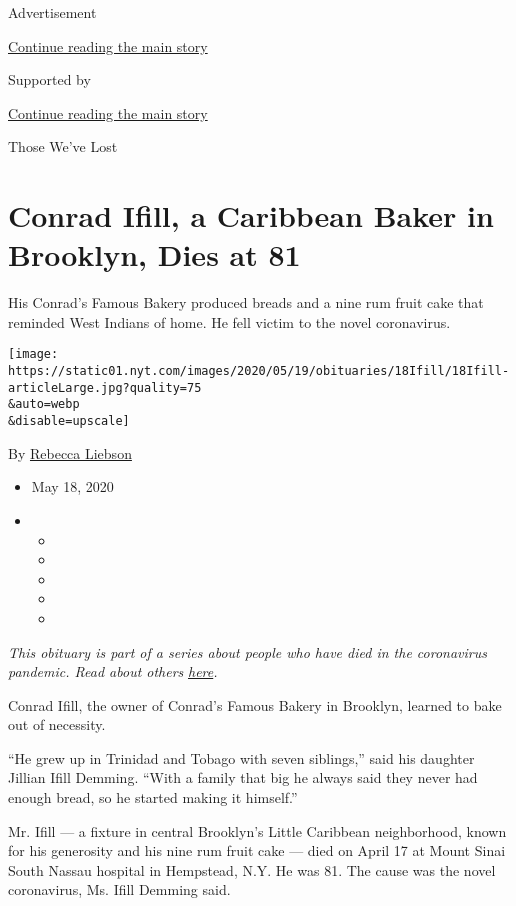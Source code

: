 Advertisement

\protect\hyperlink{after-top}{Continue reading the main story}

Supported by

\protect\hyperlink{after-sponsor}{Continue reading the main story}

Those We've Lost

\hypertarget{conrad-ifill-a-caribbean-baker-in-brooklyn-dies-at-81}{%
\section{Conrad Ifill, a Caribbean Baker in Brooklyn, Dies at
81}\label{conrad-ifill-a-caribbean-baker-in-brooklyn-dies-at-81}}

His Conrad's Famous Bakery produced breads and a nine rum fruit cake
that reminded West Indians of home. He fell victim to the novel
coronavirus.

\texttt{[image: https://static01.nyt.com/images/2020/05/19/obituaries/18Ifill/18Ifill-articleLarge.jpg?quality=75\\\&auto=webp\\\&disable=upscale]}

By \href{https://www.nytimes.com/by/rebecca-liebson}{Rebecca Liebson}

\begin{itemize}
\item
  May 18, 2020
\item
  \begin{itemize}
  \item
  \item
  \item
  \item
  \item
  \end{itemize}
\end{itemize}

\emph{This obituary is part of a series about people who have died in
the coronavirus pandemic. Read about others}
\href{https://www.nytimes.com/series/people-who-have-died-of-the-coronavirus}{\emph{here}}\emph{.}

Conrad Ifill, the owner of Conrad's Famous Bakery in Brooklyn, learned
to bake out of necessity.

``He grew up in Trinidad and Tobago with seven siblings,'' said his
daughter Jillian Ifill Demming. ``With a family that big he always said
they never had enough bread, so he started making it himself.''

Mr. Ifill --- a fixture in central Brooklyn's Little Caribbean
neighborhood, known for his generosity and his nine rum fruit cake ---
died on April 17 at Mount Sinai South Nassau hospital in Hempstead, N.Y.
He was 81. The cause was the novel coronavirus, Ms. Ifill Demming said.

